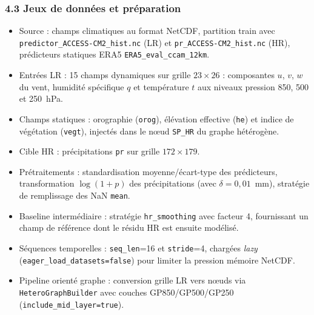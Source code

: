 \documentclass[12pt,a4paper]{article}
\begin{document}
\subsubsection*{4.3 Jeux de donn\'ees et pr\'eparation}
\begin{itemize}
    \item Source : champs climatiques au format NetCDF, partition train avec \texttt{predictor\_ACCESS-CM2\_hist.nc} (LR) et \texttt{pr\_ACCESS-CM2\_hist.nc} (HR), pr\'edicteurs statiques ERA5 \texttt{ERA5\_eval\_ccam\_12km}.
    \item Entr\'ees LR : 15 champs dynamiques sur grille $23 \times 26$ : composantes $u$, $v$, $w$ du vent, humidit\'e sp\'ecifique $q$ et temp\'erature $t$ aux niveaux pression 850, 500 et 250~hPa.
    \item Champs statiques : orographie (\texttt{orog}), \'el\'evation effective (\texttt{he}) et indice de v\'eg\'etation (\texttt{vegt}), inject\'es dans le n\oe ud \texttt{SP\_HR} du graphe h\'et\'erog\`ene.
    \item Cible HR : pr\'ecipitations \texttt{pr} sur grille $172 \times 179$.
    \item Pr\'etraitements : standardisation moyenne/\'ecart-type des pr\'edicteurs, transformation $\log(1+p)$ des pr\'ecipitations (avec $\delta=0{,}01$~mm), strat\'egie de remplissage des NaN \texttt{mean}.
    \item Baseline interm\'ediaire : strat\'egie \texttt{hr\_smoothing} avec facteur 4, fournissant un champ de r\'ef\'erence dont le r\'esidu HR est ensuite mod\'elis\'e.
    \item S\'equences temporelles : \texttt{seq\_len}=16 et \texttt{stride}=4, charg\'ees \emph{lazy} (\texttt{eager\_load\_datasets=false}) pour limiter la pression m\'emoire NetCDF.
    \item Pipeline orient\'e graphe : conversion grille LR vers n\oe uds via \texttt{HeteroGraphBuilder} avec couches GP850/GP500/GP250 (\texttt{include\_mid\_layer=true}).
\end{itemize}
\end{document}
